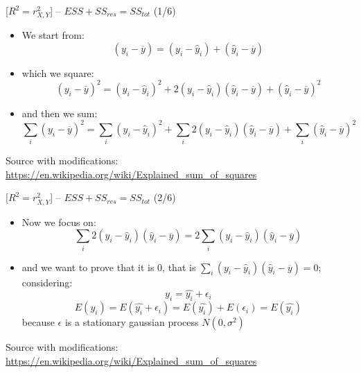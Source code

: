 \documentclass{beamer}
\begin{document}
\begin{frame}
{\centerline{ [$R^2 = r_{X,Y}^2$] -- $ESS + SS_{res} = SS_{tot} $ (1/6)}}

\begin{itemize}
\item We start from:
$$(y_{i}-{\overline {y}})=(y_{i}-{\hat {y}}_{i})+({\hat {y}}_{i}-{\overline {y}})$$

\item which we square:
$$(y_{i}-{\overline {y}})^2=(y_{i}-{\hat {y}}_{i})^2 + 2(y_{i}-{\hat {y}}_{i})({\hat {y}}_{i}-{\overline {y}}) + ({\hat {y}}_{i}-{\overline {y}})^2$$

\item and then we sum:
$$\sum_i(y_{i}-{\overline {y}})^2=\sum_i(y_{i}-{\hat {y}}_{i})^2 + \sum_i2(y_{i}-{\hat {y}}_{i})({\hat {y}}_{i}-{\overline {y}}) + \sum_i({\hat {y}}_{i}-{\overline {y}})^2$$


\end{itemize}

\begin{center}
\tiny 
Source with modifications: \url{https://en.wikipedia.org/wiki/Explained_sum_of_squares}
\end{center}

\end{frame}

\begin{frame}
{\centerline{ [$R^2 = r_{X,Y}^2$] -- $ESS + SS_{res} = SS_{tot} $ (2/6)}}

\begin{itemize}
\item Now we focus on:
$$\sum_i2(y_{i}-{\hat {y}}_{i})({\hat {y}}_{i}-{\overline {y}}) = 2\sum_i(y_{i}-{\hat {y}}_{i})({\hat {y}}_{i}-{\overline {y}}) $$
\item and we want to prove that it is 0, that is $\sum_i(y_{i}-{\hat {y}}_{i})({\hat {y}}_{i}-{\overline {y}}) = 0$;  considering:
$$y_i = \hat{y_i} + \epsilon_i$$
$$ E(y_i) = E(\hat{y_i} + \epsilon_i) = E(\hat{y_i}) + E(\epsilon_i) = E(\hat{y_i}) $$
because $\epsilon$ is a stationary gaussian process $N(0,\sigma^2)$

\end{itemize}

\begin{center}
\tiny 
Source with modifications: \url{https://en.wikipedia.org/wiki/Explained_sum_of_squares}
\end{center}

\end{frame}
\end{document}
